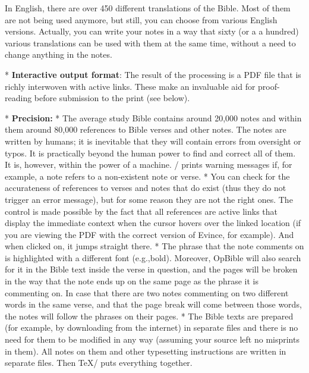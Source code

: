 In English, there are over 450 different translations of the Bible.
Most of them are not being used anymore, but still, 
you can choose from  various English versions. 
Actually, you can write your notes in a way that sixty (or a a hundred) various translations can be used with them at the same time, 
without a need to change anything in the notes.


* {\bf Interactive output format}:
  The result of the processing is a PDF file that is richly interwoven with active links. 
  These make an invaluable aid for proof-reading  before submission to the print (see below).

* {\bf Precision:} \begitems
  * The average study Bible contains around 20,000 notes and within them around 80,000
  references to Bible verses and other notes. The notes are written by humans; it is inevitable  that  they will contain errors from oversight or typos. It is practically beyond the human power 
  to find and correct  all of them. It is, however, within the power of a machine. \OpBible/ prints warning messages  if, for example, a note refers to a non-existent note or verse.
*  You can  check for the accurateness of references to verses and notes that do exist (thus they do 
   not trigger an error message), but for some reason they are not the right ones.
    The control is made possible by the fact that all references are active links that display the immediate context when the cursor hovers over
   the linked location (if you are viewing the PDF with the correct version of Evince, for example). And when clicked on, it jumps straight there. 
  * The phrase that the note comments on is highlighted with a different font (e.g.,bold).
    Moreover, OpBible will also search for it in the Bible text inside the verse in question, and the pages will be broken in the way that 
    the note ends up on the same page as the phrase it is commenting on.
    In case that there are two notes commenting on two different words in the same verse, and that    the page break will come between those words,  the notes will follow
   the phrases on their pages. %
   * The Bible texts are prepared (for example, by downloading  from the internet) in separate files and there is no need for them to be modified in any way (assuming your source left no misprints in them). All notes on them and other typesetting instructions are written in separate files. Then \TeX/  puts everything together.
    \enditems
\enditems

